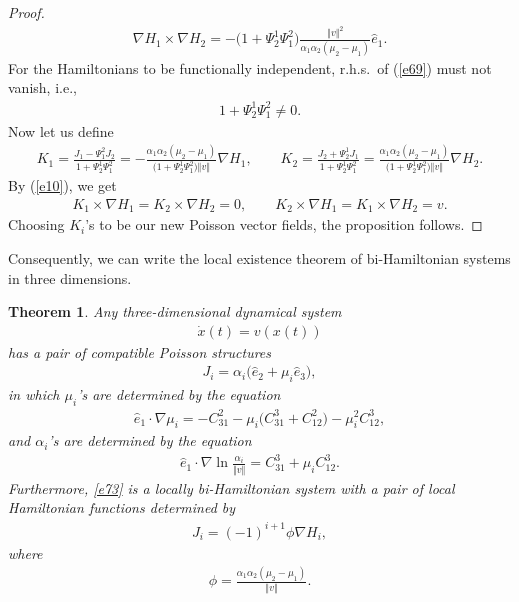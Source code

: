 \documentclass[10pt,a4paper]{amsart}
\numberwithin{equation}{section}
\newtheorem{Theorem}{Theorem}[section]
\begin{document}
\begin{proof}
\begin{gather}
\nabla H_{1}\times \nabla H_{2}=-\big( 1+\Psi _{2}^{1}\Psi _{1}^{2}\big) \frac{\Vert v\Vert ^{2}}{\alpha _{1}\alpha _{2} ( \mu_{2}-\mu_{1} ) }\widehat{e}_{1}. \label{e69}
\end{gather}
For the Hamiltonians to be functionally independent, r.h.s.\ of (\ref{e69}) must not vanish, i.e.,
\begin{gather*}
1+\Psi _{2}^{1}\Psi _{1}^{2}\neq 0.
\end{gather*}
Now let us def\/ine
\begin{gather*}
K_{1} = \frac{J_{1}-\Psi _{1}^{2}J_{2}}{1+\Psi _{2}^{1}\Psi _{1}^{2}} = -\frac{\alpha _{1}\alpha _{2}(\mu _{2}-\mu _{1}) }{\big(1+\Psi _{2}^{1}\Psi _{1}^{2}\big) \Vert v\Vert }\nabla H_{1}, \qquad
K_{2} = \frac{J_{2}+\Psi _{2}^{1}J_{1}}{1+\Psi _{2}^{1}\Psi _{1}^{2}} = \frac{\alpha _{1}\alpha _{2}(\mu _{2}-\mu _{1}) }{\big(1+\Psi
_{2}^{1}\Psi _{1}^{2}\big) \Vert v\Vert }\nabla H_{2}.
\end{gather*}
By (\ref{e10}), we get
\begin{gather*} %
K_{1}\times \nabla H_{1} = K_{2}\times \nabla H_{2} = 0, \qquad
K_{2}\times \nabla H_{1} = K_{1}\times \nabla H_{2} = v.
\end{gather*}
Choosing $K_{i}$'s to be our new Poisson vector f\/ields, the proposition follows.
\end{proof}

Consequently, we can write the local existence theorem of bi-Hamiltonian systems in three dimensions.

\begin{Theorem}\label{theorem1}Any three-dimensional dynamical system
\begin{gather}
\dot{x}(t) =v ( x(t) )\label{e73}
\end{gather}
has a pair of compatible Poisson structures
\begin{gather*}
J_{i}=\alpha _{i}\big( \widehat{e}_{2}+\mu _{i}\widehat{e}_{3}\big),
\end{gather*}
in which $\mu _{i}$'s are determined by the equation
\begin{gather*}
\widehat{e}_{1}\cdot \nabla \mu _{i}=-C_{31}^{2}-\mu _{i}\big(C_{31}^{3}+C_{12}^{2}\big) -\mu _{i}^{2}C_{12}^{3},
\end{gather*}
and $\alpha _{i}$'s are determined by the equation
\begin{gather*}
\widehat{e}_{1}\cdot \nabla \ln \frac{\alpha _{i}}{\Vert v\Vert }=C_{31}^{3}+\mu _{i}C_{12}^{3}.
\end{gather*}
Furthermore, \eqref{e73} is a locally bi-Hamiltonian system with a pair of local Hamiltonian functions determined by
\begin{gather}
J_{i}= ( -1 ) ^{i+1}\phi \nabla H_{i}, \label{e77}
\end{gather}
where
\begin{gather}
\phi =\frac{\alpha _{1}\alpha _{2} ( \mu _{2}-\mu _{1} ) }{\Vert v\Vert }. \label{e78}
\end{gather}
\end{Theorem}
\end{document}
